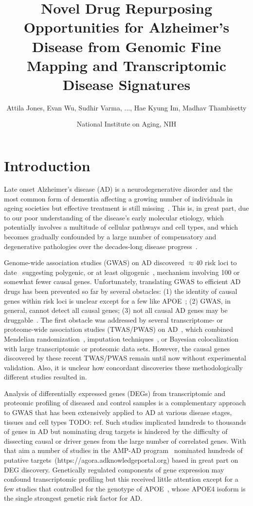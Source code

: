 \documentclass[letterpaper]{article}
\title{Novel Drug Repurposing Opportunities for Alzheimer's Disease from
  Genomic Fine Mapping and Transcriptomic Disease Signatures}
\author{Attila Jones, Evan Wu, Sudhir Varma, ..., Hae Kyung Im, Madhav Thambisetty}
\date{National Institute on Aging, NIH}
\begin{document}
\maketitle

\section{Introduction}

Late onset Alzheimer's disease (AD) is a neurodegenerative disorder and the most
common form of dementia affecting a growing number of individuals in ageing
societies but effective treatment is still
missing~\citep{Bondi2017,Masters2015}.  This is, in great part,
due to our poor understanding of the disease's early molecular etiology,
which potentially involves a multitude of cellular pathways and cell types,
and which becomes gradually confounded by a large number of compensatory
and degenerative pathologies over the decades-long disease
progress~\citep{DeStrooper2016}.

Genome-wide association studies (GWAS) on AD discovered $\approx 40$ risk loci
to date~\citep{Jansen2019,Kunkle2019,Schwartzentruber2021,Wightman2021}
suggesting polygenic, or at least oligogenic~\citep{Zhang2020}, mechanism
involving 100 or somewhat fewer causal genes.  Unfortunately, translating GWAS
to efficient AD drugs has been prevented so far by several obstacles: (1) the
identity of causal genes within risk loci is unclear except for a few like
APOE~\citep{Yamazaki2019}; (2) GWAS, in general, cannot detect all causal
genes; (3) not all causal AD genes may be
druggable~\citep{Cao2014,Lau2020,Floris2018,Finan2017}.  The first obstacle
was addressed by several transcriptome- or proteome-wide association studies
(TWAS/PWAS) on
AD~\citep{Jansen2019,Kunkle2019,Gerring2020,Baird2021,Schwartzentruber2021,Wingo2021},
which combined Mendelian randomization~\citep{DaveySmith2014,Lawlor2008},
imputation techniques~\citep{Barbeira2018,Barbeira2019a}, or Bayesian
colocalization~\citep{Wen2017} with large transcriptomic or proteomic data
sets.  However, the causal genes discovered by these recent TWAS/PWAS remain
until now without experimental validation.  Also, it is unclear how concordant
discoveries these methodologically different studies resulted in.

Analysis of differentially expressed genes (DEGs) from transcriptomic and
proteomic profiling of diseased and control samples is a complementary
approach to GWAS that has been extensively applied to AD at various disease
stages, tissues and cell types TODO: ref.  Such studies implicated hundreds to
thousands of genes in AD but nominating drug targets is hindered by the
difficulty of dissecting causal or driver genes from the large number of
correlated genes.  With that aim a number of studies in the AMP-AD
program~\citep{Greenwood2020} nominated hundreds of putative
targets~(https://agora.adknowledgeportal.org) based in
great part on DEG discovery.  Genetically regulated components of gene
expression may confound transcriptomic profiling but this received little attention
except for a few studies that controlled for the genotype of
APOE~\citep{Taubes2021,Lin2018,RobertsJackson2021}, whose APOE4
isoform is the single strongest genetic risk factor for AD.
\end{document}

